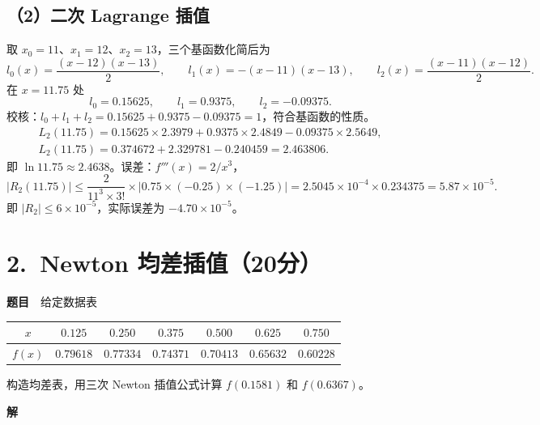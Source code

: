 \documentclass[a4paper,11pt]{ctexart}
\begin{document}
\subsection*{（2）二次 Lagrange 插值}
取 $x_0=11$、$x_1=12$、$x_2=13$，三个基函数化简后为
\[
  l_0(x)=\frac{(x-12)(x-13)}{2},\qquad
  l_1(x)=-(x-11)(x-13),\qquad
  l_2(x)=\frac{(x-11)(x-12)}{2}.
\]
在 $x=11.75$ 处
\[
  l_0=0.15625,\qquad l_1=0.9375,\qquad l_2=-0.09375 .
\]
{\small 校核：$l_0+l_1+l_2=0.15625+0.9375-0.09375=1$，符合基函数的性质。}
\begin{gather*}
  L_2(11.75)=0.15625\times 2.3979+0.9375\times 2.4849-0.09375\times 2.5649,\\
  L_2(11.75)=0.374672+2.329781-0.240459=2.463806 .
\end{gather*}
即 $\ln 11.75\approx 2.4638$。误差：$f'''(x)=2/x^{3}$，
\[
  |R_2(11.75)|\le \frac{2}{11^{3}\times 3!}
  \times\bigl|0.75\times(-0.25)\times(-1.25)\bigr|
  =2.5045\times10^{-4}\times 0.234375=5.87\times 10^{-5}.
\]
即 $|R_2|\le 6\times 10^{-5}$，实际误差为 $-4.70\times 10^{-5}$。

\section*{2.\ Newton 均差插值（20分）}

\textbf{题目}　给定数据表
\begin{center}
  \begin{tabular}{ccccccc}
    \toprule
    $x$      & $0.125$  & $0.250$  & $0.375$  & $0.500$  & $0.625$  & $0.750$  \\
    \midrule
    $f(x)$   & $0.79618$ & $0.77334$ & $0.74371$ & $0.70413$ & $0.65632$ & $0.60228$ \\
    \bottomrule
  \end{tabular}
\end{center}
构造均差表，用三次 Newton 插值公式计算 $f(0.1581)$ 和 $f(0.6367)$。

\textbf{解}
\end{document}
